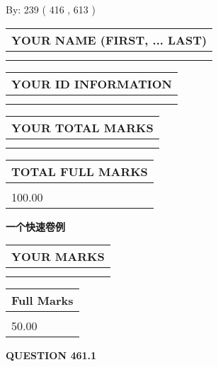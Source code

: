 \documentclass{ctexart}
\begin{document}
   
\hspace{1.0in} By: 
 239 ( 416 ,  613 )
   
   
   
   
\newpage 
\setcounter{page}{ 
   461001 } 
   
   
   
   
\noindent\begin{tabular}{|l|}
\hline
YOUR NAME (FIRST, ... LAST)  \\
\hline
 \\ 
 \\ 
\hline
\end{tabular}
\hspace{0.05in} \begin{tabular}{|l|}
\hline
 YOUR   ID   INFORMATION  \\
\hline
 \\ 
 \\ 
\hline
\end{tabular}
   
   
\vspace{0.2in}\noindent\begin{tabular}{|l|}
\hline
YOUR TOTAL MARKS  \\
\hline
 \\ 
 \\ 
\hline
\end{tabular}
\hspace{0.05in} \begin{tabular}{|l|}
\hline
TOTAL FULL MARKS  \\
\hline
 \\ 
100.00 \\
\hline
\end{tabular}
   
   
 \vspace{0.2in}
{\LARGE {\textbf{ 一个快速卷例}}}
   
   
  
\vspace{0.2in}
  
\noindent\begin{tabular}{|l|}
\hline
 YOUR MARKS  \\
\hline
 \\ 
 \\ 
\hline
\end{tabular}
\hspace{0.05in} \begin{tabular}{|l|}
\hline
 Full Marks  \\
\hline
 \\ 
50.00 \\
\hline
\end{tabular}
{\textbf{\Large{QUESTION
461.1 
}}}
  
\end{document}
